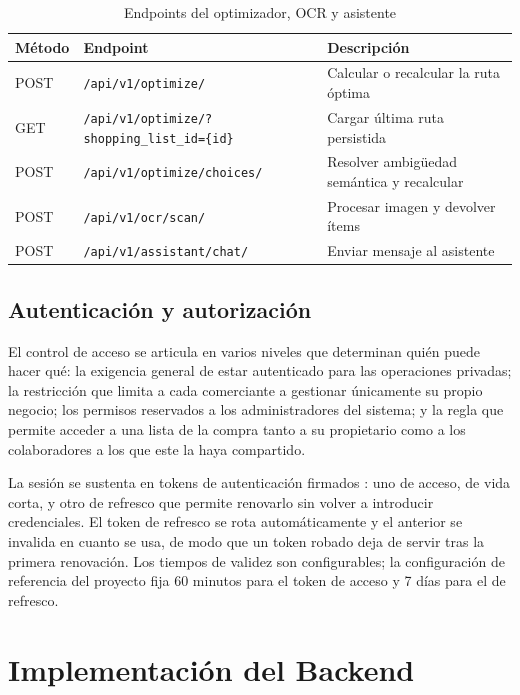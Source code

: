 \begin{table}[htbp]
\centering
\caption{Endpoints del optimizador, OCR y asistente}
\label{tab:api-core}
\small
\begin{tabular}{@{}lll@{}}
\toprule
\textbf{M\'etodo} & \textbf{Endpoint} & \textbf{Descripci\'on} \\
\midrule
POST & \texttt{/api/v1/optimize/} & Calcular o recalcular la ruta \'optima \\
GET & \texttt{/api/v1/optimize/?shopping\_list\_id=\{id\}} & Cargar \'ultima ruta persistida \\
POST & \texttt{/api/v1/optimize/choices/} & Resolver ambig\"uedad sem\'antica y recalcular \\
POST & \texttt{/api/v1/ocr/scan/} & Procesar imagen y devolver \'items \\
POST & \texttt{/api/v1/assistant/chat/} & Enviar mensaje al asistente \\
\bottomrule
\end{tabular}
\end{table}

\subsection{Autenticaci\'on y autorizaci\'on}\label{subsec:api-auth}

El control de acceso se articula en varios niveles que determinan qui\'en puede hacer qu\'e: la
exigencia general de estar autenticado para las operaciones privadas; la restricci\'on que limita a
cada comerciante a gestionar \'unicamente su propio negocio; los permisos reservados a los
administradores del sistema; y la regla que permite acceder a una lista de la compra tanto a su
propietario como a los colaboradores a los que este la haya compartido.

La sesi\'on se sustenta en tokens de autenticaci\'on firmados \cite{simplejwt_docs}: uno de acceso,
de vida corta, y otro de refresco que permite renovarlo sin volver a introducir credenciales. El
token de refresco se rota autom\'aticamente y el anterior se invalida en cuanto se usa, de modo que
un token robado deja de servir tras la primera renovaci\'on. Los tiempos de validez son
configurables; la configuraci\'on de referencia del proyecto fija 60 minutos para el token de
acceso y 7 d\'ias para el de refresco.

\section{Implementaci\'on del Backend}\label{sec:implementacion-backend}

